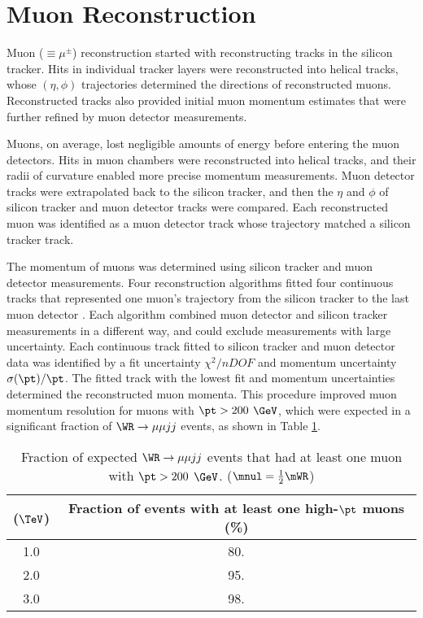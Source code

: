 \section{Muon Reconstruction}
\label{sec:muReco}
Muon ($\equiv \mu^{\pm}$) reconstruction started with reconstructing tracks in the silicon tracker.  
Hits in individual tracker layers were reconstructed into helical tracks, whose $(\eta, \phi)$ 
trajectories determined the directions of reconstructed muons.  Reconstructed tracks also provided 
initial muon momentum estimates that were further refined by muon detector measurements.

Muons, on average, lost negligible amounts of energy before entering the muon detectors.  Hits in 
muon chambers were reconstructed into helical tracks, and their radii of curvature enabled more precise 
momentum measurements.  Muon detector tracks were extrapolated back to the silicon tracker, and 
then the $\eta$ and $\phi$ of silicon tracker and muon detector tracks were compared.  Each 
reconstructed muon was identified as a muon detector track whose trajectory matched a silicon 
tracker track. 

The momentum of muons was determined using silicon tracker and muon detector measurements.  Four 
reconstruction algorithms fitted four continuous tracks that represented one muon's trajectory from 
the silicon tracker to the last muon detector \cite{cmsMuonRecoRunTwo}.  Each algorithm combined 
muon detector and silicon tracker measurements in a different way, and could exclude measurements 
with large uncertainty.  Each continuous track fitted to silicon tracker and muon detector data was 
identified by a fit uncertainty $\chi^{2}/nDOF$ and momentum uncertainty $\sigma(\pt)/\pt$.  The 
fitted track with the lowest fit and momentum uncertainties determined the reconstructed muon momenta.  
This procedure improved muon momentum resolution for muons with $\pt > 200$ $\GeV$, which were 
expected in a significant fraction of $\WR \rightarrow \mu\mu jj$ events, as shown in Table 
\ref{tab:wrHighPtMuons}.

\begin{table}[h]
	\caption{Fraction of expected $\WR \rightarrow \mu\mu jj$ events that had at least one muon with $\pt > 200$ $\GeV$. 
	($\mnul = \frac{1}{2}\mWR$)}
	\label{tab:wrHighPtMuons}
	\centering
	\begin{tabular}{c|c}
		\mWR ($\TeV$) & Fraction of events with at least one high-$\pt$ muons (\%) \\  \hline
		1.0 &  80.  \\
		2.0 &  95.  \\ 
		3.0 &  98.  \\ \hline
	\end{tabular}
\end{table}


